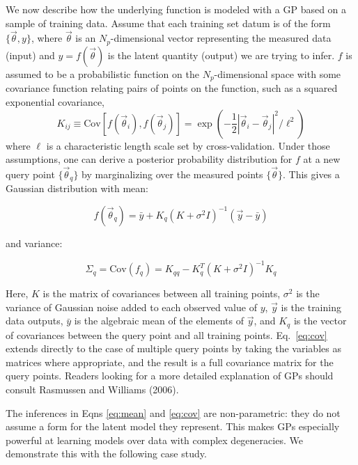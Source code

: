 \documentclass[prd,nofootbib,floatfix,11pt,tightenlines]{revtex4}
\begin{document}
We now describe how the underlying function is modeled with a GP based on a
sample of training data.  Assume that each training set datum is of the
form $\{\vec{\theta},y\}$, where $\vec{\theta}$ is an $N_p$-dimensional
vector representing the measured data (input) and $y = f(\vec{\theta})$ is the
latent quantity (output) we are trying to infer.  $f$ is assumed to be a
probabilistic function on the $N_p$-dimensional space with some covariance
function relating pairs of points on the function, such as a squared
exponential covariance,
\begin{equation}
\label{eq:covariogram}
K_{ij}\equiv\text{Cov}\left[f(\vec{\theta}_{i}),f(\vec{\theta}_{j})\right]
= \exp(-\frac{1}{2}|\vec{\theta}_{i} - \vec{\theta}_{j}|^2/\ell^2)
\end{equation}
where $\ell$
is a characteristic length scale set by cross-validation.  
Under those
assumptions, one can derive a posterior probability distribution for $f$
at a new query point $\{\vec{\theta}_{q}\}$ by marginalizing over
the measured points $\{\vec{\theta}\}$.  This gives a Gaussian distribution
with mean:

\begin{equation}
f(\vec{\theta}_q)=\bar{y}+K_q\left(K+\sigma^2 I\right)^{-1}(\vec{y}-\bar{y})
\label{eq:mean}
\end{equation}

\noindent
and variance:

\begin{equation}
\Sigma_{q} = \text{Cov}(f_{q}) = K_{qq} - K_q^T (K + \sigma^2I)^{-1} K_q
\label{eq:cov}
\end{equation}

\noindent
Here, $K$ is the matrix of
covariances between all training points, $\sigma^2$ is the variance of
Gaussian noise added to each observed value of $y$, $\vec{y}$
is the training data outputs, $\bar{y}$ is the algebraic mean of the elements of
$\vec{y}$, and
$K_q$ is the vector of covariances between the query point and all
training points.  Eq.~\ref{eq:cov} extends directly to the case of multiple
query points by taking the variables as matrices where appropriate, and the
result is a full covariance matrix for the query points.  Readers looking
for a more detailed explanation of GPs should consult
Rasmussen and Williams (2006).


The inferences in Eqns \ref{eq:mean} and \ref{eq:cov} are non-parametric:
they do not assume a form for the latent model they represent.  This makes GPs
especially powerful at learning models over data
with complex degeneracies.  We demonstrate this with the following 
case study.
\end{document}
